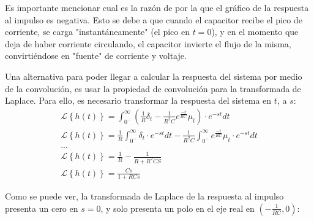 \documentclass[12pt,a4paper]{report}
\begin{document}
\begin{enumerate}[label=\alph*)]
      Es importante mencionar cual es la razón de por la que el gráfico de la respuesta al impulso es negativa.
      Esto se debe a que cuando el capacitor recibe el pico de corriente, se carga "instantáneamente"
      (el pico en $t=0$), y en el momento que deja de haber corriente circulando, el capacitor invierte el flujo de la
      misma, convirtiéndose en "fuente" de corriente y voltaje.

      Una alternativa para poder llegar a calcular la respuesta del sistema por medio de la convolución, es usar la
      propiedad de convolución para la transformada de Laplace. Para ello, es necesario transformar la respuesta del
      sistema en $t$, a $s$:
      \begin{gather*}
        \mathcal{L}\left\{h(t)\right\} = \int_{0^-}^{\infty} \left(\frac{1}{R} \delta_t - \frac{1}{R^2C}e^{\frac{-t}{RC}} 
          \mu_t\right) \cdot e^{-st} dt\\[6pt]
        \mathcal{L}\left\{h(t)\right\} = \frac{1}{R} \int_{0^-}^{\infty} \delta_t \cdot e^{-st} dt - \frac{1}{R^2C} 
        \int_{0^-}^{\infty} e^{\frac{-t}{RC}} \mu_t \cdot e^{-st} dt\\[6pt]
        ...\\[6pt]
        \mathcal{L}\left\{h(t)\right\} = \frac{1}{R} - \frac{1}{R+R^2CS}\\[6pt]
        \mathcal{L}\left\{h(t)\right\} = \frac{Cs}{1+RCs}
      \end{gather*}

      \newpage
      Como se puede ver, la transformada de Laplace de la respuesta al impulso presenta un cero en $s = 0$, y solo
      presenta un polo en el eje real en $\left(-\frac{1}{RC},0\right)$:


\end{enumerate}
\end{document}
